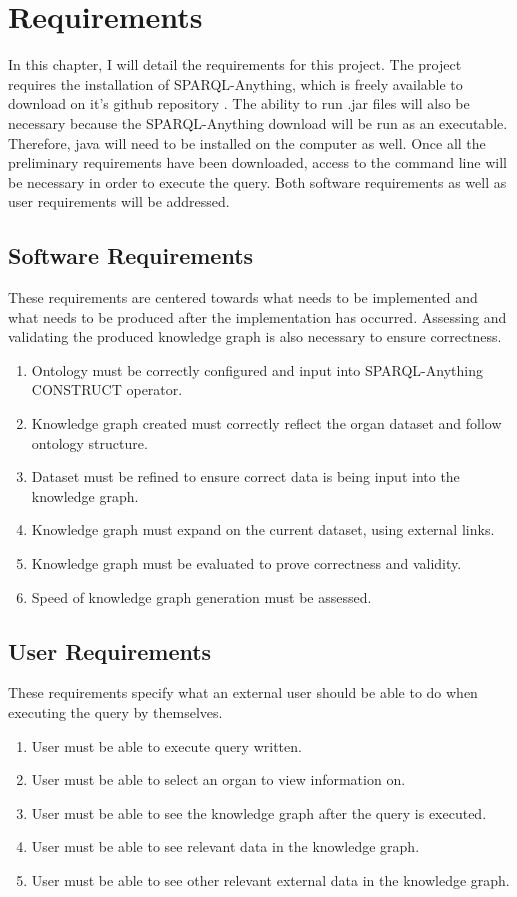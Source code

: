 \chapter{Requirements}
In this chapter, I will detail the requirements for this project. The project requires the installation of SPARQL-Anything, which is freely available to download on it's github repository \cite{sparqlanythinggithub}. The ability to run .jar files will also be necessary because the SPARQL-Anything download will be run as an executable. Therefore, java will need to be installed on the computer as well. Once all the preliminary requirements have been downloaded, access to the command line will be necessary in order to execute the query. Both software requirements as well as user requirements will be addressed.

\section{Software Requirements}
\hspace{0.5cm} These requirements are centered towards what needs to be implemented and what needs to be produced after the implementation has occurred. Assessing and validating the produced knowledge graph is also necessary to ensure correctness.
\begin{enumerate}
\item Ontology must be correctly configured and input into SPARQL-Anything CONSTRUCT operator.
\item Knowledge graph created must correctly reflect the organ dataset and follow ontology structure.
\item Dataset must be refined to ensure correct data is being input into the knowledge graph.
\item Knowledge graph must expand on the current dataset, using external links.
\item Knowledge graph must be evaluated to prove correctness and validity.
\item Speed of knowledge graph generation must be assessed.
\end{enumerate}

\section{User Requirements}
\hspace{0.5cm} These requirements specify what an external user should be able to do when executing the query by themselves. 
\begin{enumerate}
\item User must be able to execute query written.
\item User must be able to select an organ to view information on. 
\item User must be able to see the knowledge graph after the query is executed.
\item User must be able to see relevant data in the knowledge graph.
\item User must be able to see other relevant external data in the knowledge graph.
\end{enumerate}

